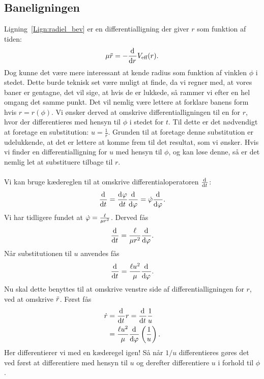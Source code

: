 \subsection{Baneligningen}
Ligning~\eqref{Lign:radiel_bev} er en differentialligning der giver $r$ som funktion af tiden:
\begin{align}
	\mu \ddot{r} = - \frac{\mathrm{d}^{}{}}{{\mathrm{d} {r}}^{}} V_\text{eff} (r).
\end{align}
Dog kunne det være mere interessant at kende radius som funktion af vinklen $\phi$ i stedet. Dette burde teknisk set være muligt at finde, da vi regner med, at vores baner er gentagne, det vil sige, at hvis de er lukkede, så rammer vi efter en hel omgang det samme punkt. Det vil nemlig være lettere at forklare banens form hvis $r = r(\phi)$. Vi ønsker derved at omskrive differentialligningen til en for $r$, hvor der differentieres med hensyn til $\phi$ i stedet for $t$. Til dette er det nødvendigt at foretage en substitution: $u = \frac{1}{r}$. Grunden til at foretage denne substitution er udelukkende, at det er lettere at komme frem til det resultat, som vi ønsker. Hvis vi finder en differentialligning for $u$ med hensyn til $\phi$, og kan løse denne, så er det nemlig let at substituere tilbage til $r$. \\ \\
%
%
Vi kan bruge kædereglen til at omskrive differentialoperatoren $\frac{\mathrm{d}^{}{}}{{\mathrm{d} {t}}^{}}$:
\begin{align}
	\frac{\mathrm{d}^{}{}}{{\mathrm{d} {t}}^{}} = \frac{\mathrm{d}^{}{\varphi}}{{\mathrm{d} {t}}^{}} \frac{\mathrm{d}^{}{}}{{\mathrm{d} {\varphi}}^{}} = \dot{\varphi}\frac{\mathrm{d}^{}{}}{{\mathrm{d} {\varphi}}^{}}.
\end{align}
Vi har tidligere fundet at $\dot{\varphi} = \frac{\ell }{\mu r^2}$. Derved fås
\begin{align}
	\frac{\mathrm{d}^{}{}}{{\mathrm{d} {t}}^{}} = \frac{\ell }{\mu r^2} \frac{\mathrm{d}^{}{}}{{\mathrm{d} {\varphi}}^{}}.
\end{align}
Når substitutionen til $u$ anvendes fås
\begin{align}
	\frac{\mathrm{d}^{}{}}{{\mathrm{d} {t}}^{}} = \frac{\ell u^2}{\mu} \frac{\mathrm{d}^{}{}}{{\mathrm{d} {\varphi}}^{}}.
\end{align}
Nu skal dette benyttes til at omskrive venstre side af differentialligningen for $r$, ved at omskrive $\ddot{r}$. Først fås
\begin{equation}
\begin{aligned}
	\dot{r} &= \frac{\mathrm{d}^{}{}}{{\mathrm{d} {t}}^{}} r = \frac{\mathrm{d}^{}{}}{{\mathrm{d} {t}}^{}} \frac{1}{u} \\ 
	 &=\frac{\ell u^2}{\mu} \frac{\mathrm{d}^{}{}}{{\mathrm{d} {\varphi}}^{}} \left(\frac{1}{u}\right).
\end{aligned}
\end{equation}
Her differentierer vi med en kæderegel igen! Så når $1/u$ differentieres gøres det ved først at differentiere med hensyn til $u$ og derefter differentiere $u$ i forhold til $\phi$.
